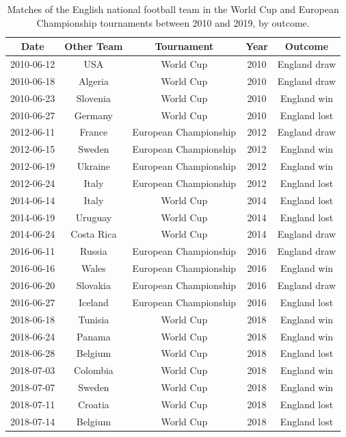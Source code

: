 \documentclass[12pt, a4paper]{article}
\begin{document}
\begin{table}[!htbp]
\centering
    \caption{Matches of the English national football team in the World Cup and European Championship tournaments between 2010 and 2019, by outcome.}
\begin{tabular}{ccccc}
  \hline
\textbf{Date} & \textbf{Other Team} & \textbf{Tournament} & \textbf{Year} & \textbf{Outcome} \\ 
  \hline
2010-06-12 & USA & World Cup & 2010 & England draw \\ 
  2010-06-18 & Algeria & World Cup & 2010 & England draw \\ 
  2010-06-23 & Slovenia & World Cup & 2010 & England win \\ 
  2010-06-27 & Germany & World Cup & 2010 & England lost \\ 
  2012-06-11 & France & European Championship & 2012 & England draw \\ 
  2012-06-15 & Sweden & European Championship & 2012 & England win \\ 
  2012-06-19 & Ukraine & European Championship & 2012 & England win \\ 
  2012-06-24 & Italy & European Championship & 2012 & England lost \\ 
  2014-06-14 & Italy & World Cup & 2014 & England lost \\ 
  2014-06-19 & Uruguay & World Cup & 2014 & England lost \\ 
  2014-06-24 & Costa Rica & World Cup & 2014 & England draw \\ 
  2016-06-11 & Russia & European Championship & 2016 & England draw \\ 
  2016-06-16 & Wales & European Championship & 2016 & England win \\ 
  2016-06-20 & Slovakia & European Championship & 2016 & England draw \\ 
  2016-06-27 & Iceland & European Championship & 2016 & England lost \\ 
  2018-06-18 & Tunisia & World Cup & 2018 & England win \\ 
  2018-06-24 & Panama & World Cup & 2018 & England win \\ 
  2018-06-28 & Belgium & World Cup & 2018 & England lost \\ 
  2018-07-03 & Colombia & World Cup & 2018 & England win \\ 
  2018-07-07 & Sweden & World Cup & 2018 & England win \\ 
  2018-07-11 & Croatia & World Cup & 2018 & England lost \\ 
  2018-07-14 & Belgium & World Cup & 2018 & England lost \\ 
   \hline
\end{tabular}
  \label{Tab:matches}
\end{table}
\end{document}
